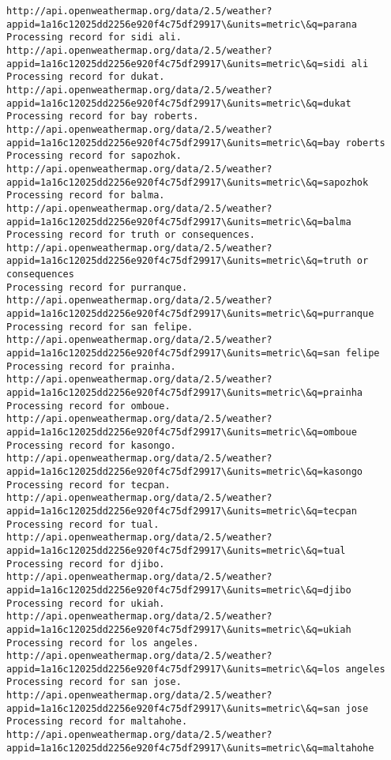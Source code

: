 \documentclass[11pt]{article}
\begin{document}
\begin{Verbatim}[commandchars=\\\{\}]
http://api.openweathermap.org/data/2.5/weather?appid=1a16c12025dd2256e920f4c75df29917\&units=metric\&q=parana
Processing record for sidi ali.
http://api.openweathermap.org/data/2.5/weather?appid=1a16c12025dd2256e920f4c75df29917\&units=metric\&q=sidi ali
Processing record for dukat.
http://api.openweathermap.org/data/2.5/weather?appid=1a16c12025dd2256e920f4c75df29917\&units=metric\&q=dukat
Processing record for bay roberts.
http://api.openweathermap.org/data/2.5/weather?appid=1a16c12025dd2256e920f4c75df29917\&units=metric\&q=bay roberts
Processing record for sapozhok.
http://api.openweathermap.org/data/2.5/weather?appid=1a16c12025dd2256e920f4c75df29917\&units=metric\&q=sapozhok
Processing record for balma.
http://api.openweathermap.org/data/2.5/weather?appid=1a16c12025dd2256e920f4c75df29917\&units=metric\&q=balma
Processing record for truth or consequences.
http://api.openweathermap.org/data/2.5/weather?appid=1a16c12025dd2256e920f4c75df29917\&units=metric\&q=truth or consequences
Processing record for purranque.
http://api.openweathermap.org/data/2.5/weather?appid=1a16c12025dd2256e920f4c75df29917\&units=metric\&q=purranque
Processing record for san felipe.
http://api.openweathermap.org/data/2.5/weather?appid=1a16c12025dd2256e920f4c75df29917\&units=metric\&q=san felipe
Processing record for prainha.
http://api.openweathermap.org/data/2.5/weather?appid=1a16c12025dd2256e920f4c75df29917\&units=metric\&q=prainha
Processing record for omboue.
http://api.openweathermap.org/data/2.5/weather?appid=1a16c12025dd2256e920f4c75df29917\&units=metric\&q=omboue
Processing record for kasongo.
http://api.openweathermap.org/data/2.5/weather?appid=1a16c12025dd2256e920f4c75df29917\&units=metric\&q=kasongo
Processing record for tecpan.
http://api.openweathermap.org/data/2.5/weather?appid=1a16c12025dd2256e920f4c75df29917\&units=metric\&q=tecpan
Processing record for tual.
http://api.openweathermap.org/data/2.5/weather?appid=1a16c12025dd2256e920f4c75df29917\&units=metric\&q=tual
Processing record for djibo.
http://api.openweathermap.org/data/2.5/weather?appid=1a16c12025dd2256e920f4c75df29917\&units=metric\&q=djibo
Processing record for ukiah.
http://api.openweathermap.org/data/2.5/weather?appid=1a16c12025dd2256e920f4c75df29917\&units=metric\&q=ukiah
Processing record for los angeles.
http://api.openweathermap.org/data/2.5/weather?appid=1a16c12025dd2256e920f4c75df29917\&units=metric\&q=los angeles
Processing record for san jose.
http://api.openweathermap.org/data/2.5/weather?appid=1a16c12025dd2256e920f4c75df29917\&units=metric\&q=san jose
Processing record for maltahohe.
http://api.openweathermap.org/data/2.5/weather?appid=1a16c12025dd2256e920f4c75df29917\&units=metric\&q=maltahohe

\end{Verbatim}
\end{document}
